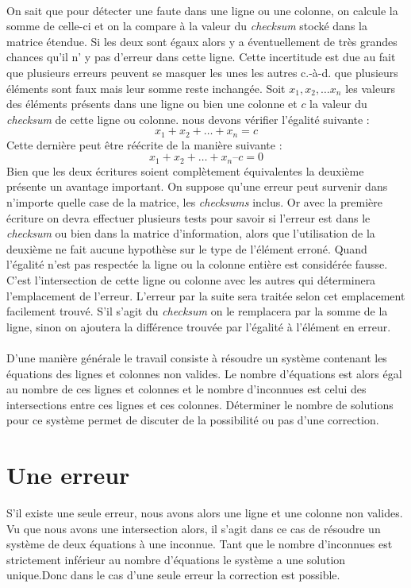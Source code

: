 \documentclass[a4paper, 10pt]{report}
\begin{document}
\paragraph*{}
On sait que pour détecter une faute dans une ligne ou une colonne,  on calcule la somme de celle-ci et on la compare à la 
valeur du \textit{checksum} stocké dans la matrice étendue. Si les deux sont égaux alors y a éventuellement de très grandes 
chances qu’il n’ y pas d’erreur dans cette ligne. Cette incertitude est due au fait que plusieurs erreurs peuvent se masquer 
les unes les autres c.-à-d. que plusieurs éléments sont faux mais leur somme reste inchangée. Soit $x_1, x_2,\ldots x_n$ 
les valeurs des éléments présents dans une ligne ou bien une colonne et $c$ la valeur du \textit{checksum} de cette ligne 
ou colonne. nous devons vérifier l’égalité suivante : \[x_1 + x_2 + \ldots + x_n = c\]
Cette dernière peut être réécrite de la manière suivante : \[x_1 + x_2 + \ldots + x_n – c = 0\]
Bien que les deux écritures soient complètement équivalentes la deuxième présente un avantage important. On suppose 
qu’une erreur peut survenir dans n’importe quelle case de la matrice, les \textit{checksums} inclus. Or avec la 
première écriture on devra effectuer plusieurs tests pour savoir si l’erreur est dans le \textit{checksum} ou bien dans 
la matrice d’information, alors que l’utilisation de la deuxième ne fait aucune hypothèse sur le type de l’élément erroné. 
Quand l’égalité n’est pas respectée la ligne ou la colonne entière est considérée fausse. C’est l’intersection de cette 
ligne ou colonne avec les autres qui déterminera l’emplacement de l’erreur. L’erreur par la suite sera traitée selon cet 
emplacement facilement trouvé. S’il s’agit du \textit{checksum} on le remplacera par la somme de la ligne, sinon on ajoutera 
la différence trouvée par l’égalité à l’élément en erreur.
\paragraph*{}
D’une manière générale le travail consiste à résoudre un système contenant les équations des lignes et colonnes non valides. 
Le nombre d’équations est alors égal au nombre de ces lignes et colonnes et le nombre d’inconnues est celui des intersections 
entre ces lignes et ces colonnes.\newline
Déterminer le nombre de solutions pour ce système permet de discuter de la possibilité ou pas d’une correction.

\section{Une erreur}
S’il existe une seule erreur, nous avons alors une ligne et une colonne non valides. Vu que nous avons une intersection 
alors, il s’agit dans ce cas de résoudre un système de deux équations à une inconnue.\newline
Tant que le nombre d’inconnues est strictement inférieur au nombre d’équations le système a une solution unique.Donc 
dans le cas d’une seule erreur la correction est possible.
\end{document}

